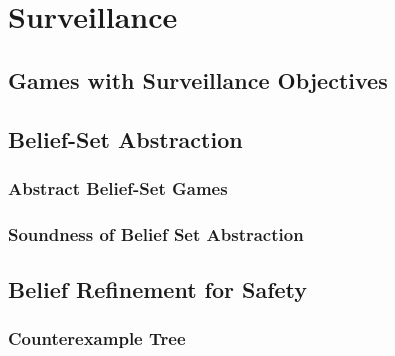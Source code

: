 
\chapter{Surveillance}




% 


\section{Games with Surveillance Objectives}\label{sec:gamedef}

%
%
\section{Belief-Set Abstraction}
\subsection{Abstract Belief-Set Games}

%
\subsection{Soundness of Belief Set Abstraction}

%
%
%
\section{Belief Refinement for Safety}%

\subsection{Counterexample Tree}

%
%
%
